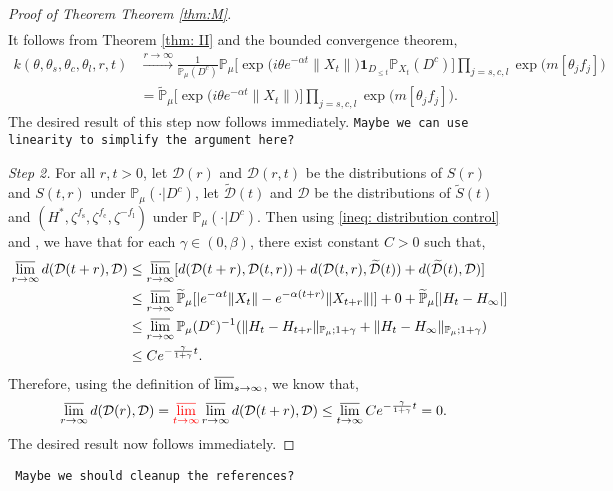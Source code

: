 \documentclass[12pt,a4paper]{amsart}
\theoremstyle{plain}
\theoremstyle{definition}
\numberwithin{equation}{section}
\begin{document}
\begin{proof}[Proof of Theorem Theorem \ref{thm:M}]
\begin{align}
\end{align}
It follows from Theorem \ref{thm: II} and the {\color{red}bounded convergence theorem,}
\begin{align}
   k(\theta,\theta_s, \theta_c,\theta_l,r,t)& \xrightarrow{r\to \infty}\frac{1}{\mathbb P_{\mu}(D^c)}\mathbb P_{\mu}\Big[\exp\Big(i\theta e^{-\alpha t}\|X_t\|\Big)\mathbf 1_{D_{\leq t}}\mathbb P_{X_t}(D^c)\Big]
   \prod_{j=s,c,l}\exp\Big(m[\theta_j f_j]\Big)\\
&=\widetilde{\mathbb P}_{\mu}\Big[\exp\Big(i\theta e^{-\alpha t}\|X_t\|\Big)\Big]
\prod_{j=s,c,l}\exp\Big(m[\theta_j f_j]\Big).
\end{align}
The desired result of this step now follows immediately. {\color{blue} \tt Maybe we can use linearity to simplify the argument here?}

\emph{Step 2.} For all $r,t>0$, let $\mathcal D(r)$ and $\mathcal D(r,t)$ be the distributions of $S(r)$ and $S(t,r)$ under $\mathbb P_{\mu}(\cdot|D^c)$, let $ \widetilde{\mathcal D}(t)$ and $\mathcal D$ be the distributions of {\color{red}$\widetilde{S}(t)$} and $(H^*,\zeta^{f_\mathrm s},\zeta^{f_\mathrm c},\zeta^{-f_\mathrm l})$ under $\mathbb P_{\mu}(\cdot|D^c)$. Then using \eqref{ineq: distribution control} and \cite[Lemma 3.3]{RenSongSunZhao2019Stable}, we have that for each $\gamma\in (0,\beta)$, there exist constant $C>0$ such that,
\begin{align}
 \varlimsup_{r\rightarrow \infty}d(\mathcal D(t+r),\mathcal D)&\leq \varlimsup_{r\rightarrow \infty}[d(\mathcal D(t+r),\mathcal D(t,r))+d(\mathcal D(t,r),\widetilde{\mathcal D}(t))+d(\widetilde{\mathcal D}(t),\mathcal D)]\\
&\leq \varlimsup_{r\rightarrow \infty}\widetilde{\mathbb P}_{\mu}[|e^{-\alpha t}\|X_t\|-e^{-\alpha (t+r)}\|X_{t+r}\||]+0+\widetilde{\mathbb P}_{\mu}[|H_t-H_{\infty}|]\\
&\leq \varlimsup_{r\rightarrow \infty}\mathbb P_{\mu}(D^c)^{-1}(\|H_t-H_{t+r}\|_{\mathbb P_{\mu};1+\gamma}+\|H_t-H_{\infty}\|_{\mathbb P_{\mu};1+\gamma})\\
&\leq Ce^{-\frac{\gamma}{1+\gamma}t}.
\end{align}
Therefore, using the definition of $\varlimsup_{s\rightarrow \infty}$, we know that,
\begin{align}
 &\varlimsup_{r\rightarrow \infty}d(\mathcal D(r),\mathcal D) 
 = {\color{red} \varlimsup_{t\to \infty}}\varlimsup_{r\rightarrow \infty}d(\mathcal D(t+r),\mathcal D)
\leq \varlimsup_{t\rightarrow \infty}Ce^{-\frac{\gamma}{1+\gamma}t} = 0.
\end{align}
The desired result now follows immediately.
\end{proof}
{\tt\color{red} Maybe we should cleanup the references?}
\end{document}
